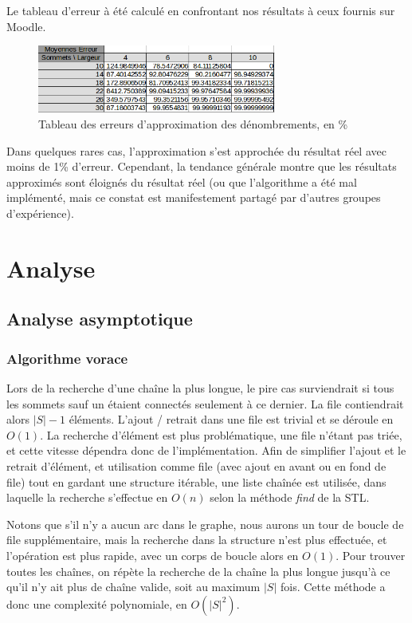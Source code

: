 \documentclass[10pt,a4paper]{article}
\begin{document}
Le tableau d'erreur à été calculé en confrontant nos résultats à ceux fournis sur Moodle.

\begin{figure}[h!]
	\centering
	\includegraphics[width=0.7\textwidth]{spreadsheet/erreurs}
	\caption{Tableau des erreurs d'approximation des dénombrements, en \%}
\end{figure}

Dans quelques rares cas, l'approximation s'est approchée du résultat réel avec moins de 1\% d'erreur. Cependant, la tendance générale montre que les résultats approximés sont éloignés du résultat réel (ou que l'algorithme a été mal implémenté, mais ce constat est manifestement partagé par d'autres groupes d'expérience).

\section{Analyse}

\subsection{Analyse asymptotique}

\subsubsection{Algorithme vorace}

Lors de la recherche d'une chaîne la plus longue, le pire cas surviendrait si tous les sommets sauf un étaient connectés seulement à ce dernier. La file contiendrait alors $ |S| - 1 $ éléments. L'ajout / retrait dans une file est trivial et se déroule en $ O(1) $. La recherche d'élément est plus problématique, une file n'étant pas triée, et cette vitesse dépendra donc de l'implémentation. Afin de simplifier l'ajout et le retrait d'élément, et utilisation comme file (avec ajout en avant ou en fond de file) tout en gardant une structure itérable, une liste chaînée est utilisée, dans laquelle la recherche s'effectue en $ O(n) $ selon la méthode \textit{find} de la STL.

Notons que s'il n'y a aucun arc dans le graphe, nous aurons un tour de boucle de file supplémentaire, mais la recherche dans la structure n'est plus effectuée, et l'opération est plus rapide, avec un corps de boucle alors en $ O(1) $. 
Pour trouver toutes les chaînes, on répète la recherche de la chaîne la plus longue jusqu'à ce qu'il n'y ait plus de chaîne valide, soit au maximum $ |S| $ fois.
Cette méthode a donc une complexité polynomiale, en $ O(|S|^{2}) $.
\end{document}
